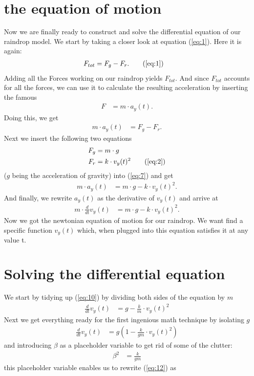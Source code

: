 \documentclass[paper=a4, fontsize=11pt]{scrartcl} %
\numberwithin{equation}{section} %
\numberwithin{figure}{section} %
\numberwithin{table}{section} %
\begin{document}
\section{the equation of motion}
Now we are finally ready to construct and solve the differential equation of our raindrop model.
We start by taking a closer look at equation (\ref{eq:1}). Here it is again:
\begin{align}
F_{tot} &= F_g - F_r. \tag{\ref{eq:1}}
\end{align}
Adding all the Forces working on our raindrop yields $F_{tot}$. And since $F_{tot}$ accounts for all the forces, we can use it to
calculate the resulting acceleration by inserting the famous 
\begin{align} \label{eq:6}
F &= m \cdot a_y(t).
\end{align}
Doing this, we get
\begin{align} \label{eq:7}
m \cdot a_y(t) &= F_g - F_r. 
\end{align}
Next we insert the following two equations 
\begin{align}
F_g &= m \cdot g \label{eq:8} \\
F_r &= k \cdot v_y(t)^2 \tag{\ref{eq:2}}
\end{align}
($g$ being the acceleration of gravity) into (\ref{eq:7}) and get
\begin{align} \label{eq:9}
m \cdot a_y(t) &= m \cdot g - k \cdot v_y(t)^2. 
\end{align}
And finally, we rewrite $a_y(t)$ as the derivative of $v_y(t)$ and arrive at
\begin{align} \label{eq:10}
m \cdot \frac{d}{dt} v_y(t) &= m \cdot g - k \cdot v_y(t)^2. 
\end{align}
Now we got the newtonian equation of motion for our raindrop. We want find a specific function $v_y(t)$ which, 
when plugged into this equation satisfies it at any value t.
\section{Solving the differential equation}
We start by tidying up (\ref{eq:10}) by dividing both sides of the equation by $m$
\begin{align} \label{eq:11}
\frac{d}{dt} v_y(t) &= g - \frac{k}{m} \cdot v_y(t)^2
\end{align}
Next we get everything ready for the first ingenious math technique by isolating $g$
\begin{align} \label{eq:12}
\frac{d}{dt} v_y(t) &= g \left(1 - \frac{k}{gm} \cdot v_y(t)^2\right)
\end{align}
and introducing $\beta$ as a placeholder variable to get rid of some of the clutter:
\begin{align} \label{eq:13}
\beta^2 &= \frac{k}{gm}
\end{align}
this placeholder variable enables us to rewrite (\ref{eq:12}) as
\end{document}

